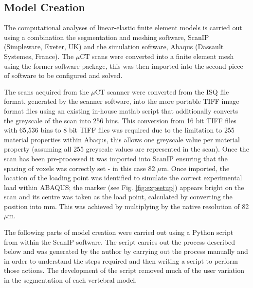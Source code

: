 
\subsection{Model Creation}\label{model-creation}

The computational analyses of linear-elastic finite element models is
carried out using a combination the segmentation and meshing software, ScanIP (Simpleware, Exeter, UK) and the simulation software, Abaqus (Dassault Systemes, France). The $\mu$CT scans were converted into a
finite element mesh using the former software package, this was then
imported into the second piece of software to be configured and solved.

The scans acquired from the \(\mu\)CT scanner were converted from the ISQ
file format, generated by the scanner software, into the more portable TIFF image format files using an existing in-house  matlab script that
additionally converts the greyscale of the scan into 256 bins. This conversion from 16 bit TIFF files with 65,536 bins to 8 bit TIFF files was required due to the limitation to 255 material properties within Abaqus, this allows one greyscale value per material property (assuming all 255 greyscale values are represented in the scan). Once the
scan has been pre-processed it was imported into ScanIP ensuring
that the spacing of voxels was correctly set - in this case 82 \(\mu\)m.
Once imported, the location of the loading point was identified to
simulate the correct experimental load within ABAQUS; the marker (see Fig. \ref{fig:expsetup})
appears bright on the scan and its centre was taken as the load point,
calculated by converting the position into mm. This was achieved by
multiplying by the native resolution of 82 \(\mu\)m.

The following parts of model creation were carried out using a Python script from within the ScanIP software. The script carries out the process described below and was generated by the author by carrying out the process manually and in order to understand the steps required and then writing a script to perform those actions. The development of the script removed much of the user variation in the segmentation of each vertebral model.

